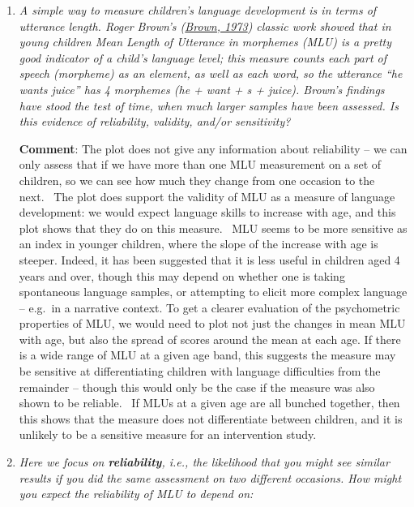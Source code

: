\documentclass{krantz}
\begin{document}
\begin{enumerate}
\def\labelenumi{\arabic{enumi}.}
\item
  \emph{A simple way to measure children's language development is in terms of utterance length. Roger Brown's (\protect\hyperlink{ref-brown1973}{Brown, 1973}) classic work showed that in young children Mean Length of Utterance in morphemes (MLU) is a pretty good indicator of a child's language level; this measure counts each part of speech (morpheme) as an element, as well as each word, so the utterance ``he wants juice'' has 4 morphemes (he + want + s + juice). Brown's findings have stood the test of time, when much larger samples have been assessed. Is this evidence of reliability, validity, and/or sensitivity?}

  \textbf{Comment}: The plot does not give any information about reliability -- we can only assess that if we have more than one MLU measurement on a set of children, so we can see how much they change from one occasion to the next.~ The plot does support the validity of MLU as a measure of language development: we would expect language skills to increase with age, and this plot shows that they do on this measure.~ MLU seems to be more sensitive as an index in younger children, where the slope of the increase with age is steeper. Indeed, it has been suggested that it is less useful in children aged 4 years and over, though this may depend on whether one is taking spontaneous language samples, or attempting to elicit more complex language -- e.g.~in a narrative context. To get a clearer evaluation of the psychometric properties of MLU, we would need to plot not just the changes in mean MLU with age, but also the spread of scores around the mean at each age. If there is a wide range of MLU at a given age band, this suggests the measure may be sensitive at differentiating children with language difficulties from the remainder -- though this would only be the case if the measure was also shown to be reliable. ~If MLUs at a given age are all bunched together, then this shows that the measure does not differentiate between children, and it is unlikely to be a sensitive measure for an intervention study.
\item
  \emph{Here we focus on \textbf{reliability}, i.e., the likelihood that you might see similar results if you did the same assessment on two different occasions. How might you expect the reliability of MLU to depend on:}


\end{enumerate}
\end{document}
